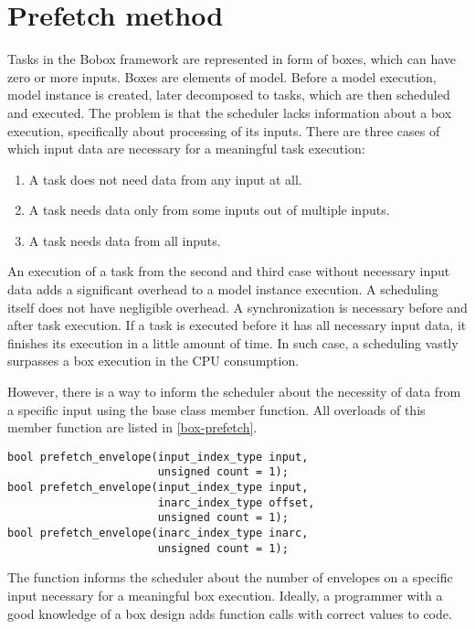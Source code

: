 \chapter{Prefetch method}
\label{prefetch}
Tasks in the Bobox framework are represented in form of boxes, which can have zero or more inputs. Boxes are elements of model. Before a model execution, model instance is created, later decomposed to tasks, which are then scheduled and executed. The problem is that the scheduler lacks information about a box execution, specifically about processing of its inputs. There are three cases of which input data are necessary for a meaningful task execution:

\begin{enumerate}
\item A task does not need data from any input at all.
\item A task needs data only from some inputs out of multiple inputs.
\item A task needs data from all inputs.
\end{enumerate}

An execution of a task from the second and third case without necessary input data adds a significant overhead to a model instance execution. A scheduling itself does not have negligible overhead. A synchronization is necessary before and after task execution. If a task is executed before it has all necessary input data, it finishes its execution in a little amount of time. In such case, a scheduling vastly surpasses a box execution in the CPU consumption.

However, there is a way to inform the scheduler about the necessity of data from a specific input using the  base class member function. All overloads of this member function are listed in \ref{box-prefetch}.

\begin{lstlisting}[caption={\code{basic\_box} prefetch member function overloads.},label={box-prefetch}]
bool prefetch_envelope(input_index_type input,
                       unsigned count = 1);
bool prefetch_envelope(input_index_type input,
                       inarc_index_type offset,
                       unsigned count = 1);
bool prefetch_envelope(inarc_index_type inarc,
                       unsigned count = 1);
\end{lstlisting}

The function informs the scheduler about the number of envelopes on a specific input necessary for a meaningful box execution. Ideally, a programmer with a good knowledge of a box design adds function calls with correct values to code.


